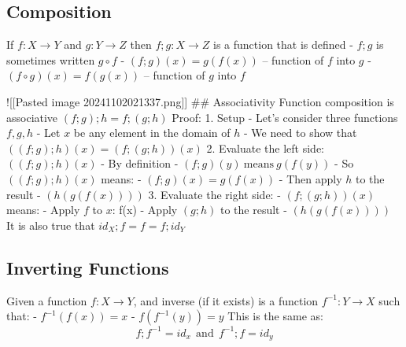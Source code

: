 \documentclass[
]{article}
\author{}
\date{}
\begin{document}
\subsection{Composition}\label{composition}

If \(f: X \to Y\) and \(g:Y\to Z\) then \(f;g:X\to Z\) is a function
that is defined - \(f;g\) is sometimes written \(g \circ f\) -
\((f;g)(x) = g(f(x))\) -- function of \(f\) into \(g\) -
\((f \circ g)(x) = f(g(x))\) -- function of \(g\) into \(f\)

!{[}{[}Pasted image 20241102021337.png{]}{]} \#\# Associativity Function
composition is associative \((f;g);h = f;(g;h)\) Proof: 1. Setup - Let's
consider three functions \(f,g,h\) - Let \(x\) be any element in the
domain of \(h\) - We need to show that \(((f;g);h)(x) = (f;(g;h))(x)\)
2. Evaluate the left side: \(((f;g);h)(x)\) - By definition -
\((f;g)(y)~\text{means}~ g(f(y))\) - So \(((f;g);h)(x)\) means: -
\((f;g)(x) = g(f(x))\) - Then apply \(h\) to the result -
\((h(g(f(x))))\) 3. Evaluate the right side: - \((f;(g;h))(x)\) means: -
Apply \(f\) to \(x\): f(x) - Apply \((g;h)\) to the result -
\((h(g(f(x))))\) It is also true that \(id_{X};f = f = f;id_{Y}\)

\subsection{Inverting Functions}\label{inverting-functions}

Given a function \(f:X \to Y\), and inverse (if it exists) is a function
\(f^{-1}:Y\to X\) such that: - \(f^{-1}(f(x)) = x\) - \(f(f^{-1}(y))=y\)
This is the same as: \[
f;f^{-1} = id_{x}~~\text{and}~~f^{-1};f = id_{y}
\]
\end{document}

